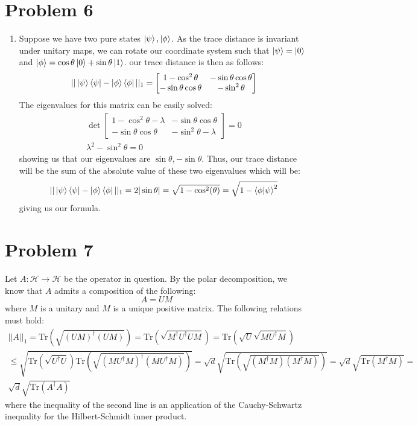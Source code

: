 \documentclass[12pt]{article}%
\begin{document}
\section*{Problem 6}
\begin{enumerate}
  \item Suppose we have two pure states $\ket{\psi},\ket{\phi}$. As the trace distance is invariant under unitary maps, we can rotate our coordinate system such that $\ket{\psi} = \ket{0}$ and $\ket{\phi} = \cos\theta \ket{0} + \sin\theta \ket{1}$. our trace distance is then as follows:
  \begin{gather*}
    ||\ket{\psi}\bra{\psi} - \ket{\phi}\bra{\phi}||_1 = \left[ \begin{matrix} 1 - \cos^2\theta & -\sin\theta\cos\theta \\ -\sin\theta\cos\theta & -\sin^2\theta \end{matrix}\right]
  \end{gather*}
  The eigenvalues for this matrix can be easily solved:
  \begin{gather*}
    \det\left[ \begin{matrix} 1 - \cos^2\theta -\lambda & -\sin\theta\cos\theta \\ -\sin\theta\cos\theta & -\sin^2\theta -\lambda \end{matrix}\right] =  0 \\
    \lambda^2 - \sin^2 \theta = 0
  \end{gather*}
  showing us that our eigenvalues are $\sin\theta, -\sin\theta$. Thus, our trace distance will be the sum of the absolute value of these two eigenvalues which will be:
  $$ ||\ket{\psi}\bra{\psi} - \ket{\phi}\bra{\phi}||_1 = 2|\sin\theta| = \sqrt{1 -
  \cos^2(\theta)} = \sqrt{1 - \bra{\phi}\ket{\psi}^2}$$
  giving us our formula.
\end{enumerate}

\section*{Problem 7}
Let $A: \mathcal{H} \rightarrow \mathcal{H}$ be the operator in question. By the polar decomposition, we know that $A$ admits a composition of the following:
$$ A = UM $$
where $M$ is a unitary and $M$ is a unique positive matrix.
The following relations must hold:
\begin{gather*}
||A||_1 = \text{Tr}(\sqrt{(UM)^\dagger(UM)}) = \text{Tr}(\sqrt{M^\dagger U^\dagger U M}) = \text{Tr}(\sqrt{U}\sqrt{M U^\dagger  M}) \\ \leq \sqrt{\text{Tr}(\sqrt{U^\dagger U})\text{Tr}(\sqrt{(MU^\dagger M)^\dagger(MU^\dagger M)})}= \sqrt{d}\sqrt{\text{Tr}(\sqrt{(M^\dagger M)(M^\dagger M)})} = \sqrt{d} \sqrt{\text{Tr}(M^\dagger M)} = \\ \sqrt{d} \sqrt{\text{Tr}(A^\dagger A)}
\end{gather*}
where the inequality of the second line is an application of the Cauchy-Schwartz inequality for the Hilbert-Schmidt inner product.
\end{document}
